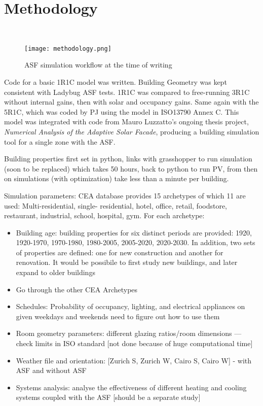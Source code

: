 
\chapter{Methodology}\
\label{ch:methodology}

\begin{figure}[h] %
  \begin{center}
    \texttt{[image: methodology.png]}
    \caption{ASF simulation workflow at the time of writing}
    \label{fig: methodoloy}
  \end{center} 
\end{figure}

Code for a basic 1R1C model was written. Building Geometry was kept consistent with Ladybug ASF tests. 1R1C was compared to free-running 3R1C without internal gains, then with solar and occupancy gains. Same again with the 5R1C, which was coded by PJ using the model in ISO13790 Annex C. This model was integrated with code from Mauro Luzzatto's ongoing thesis project, \textit{Numerical Analysis of the Adaptive Solar Facade}, producing a building simulation tool for a single zone with the ASF.\par


Building properties first set in python, links with grasshopper to run simulation (soon to be replaced) which takes 50 hours, back to python to run PV, from then on simulations (with optimization) take less than a minute per building.\par
Simulation parameters: 
CEA database provides 15 archetypes of which 11 are used: 
Multi-residential, single- residential, hotel, office, retail, foodstore, restaurant, industrial, school, hospital, gym.
For each archetype:

\begin{itemize}
 \item Building age: building properties for six distinct periods are provided: 1920, 1920-1970, 1970-1980, 1980-2005, 2005-2020, 2020-2030. In addition, two sets of properties are defined: one for new construction and another for renovation. It would be possibile to first study new buildings, and later expand to older buildings
 \item Go through the other CEA Archetypes
 \item Schedules: Probability of occupancy, lighting, and electrical appliances on given weekdays and weekends need to figure out how to use them
 \item Room geometry parameters: different glazing ratios/room dimensions --- check limits in ISO standard [not done because of huge computational time]
 \item Weather file and orientation: [Zurich S, Zurich W, Cairo S, Cairo W] - with ASF and without ASF
 \item Systems analysis: analyse the effectiveness of different heating and cooling systems coupled with the ASF [should be a separate study]
\end{itemize}

